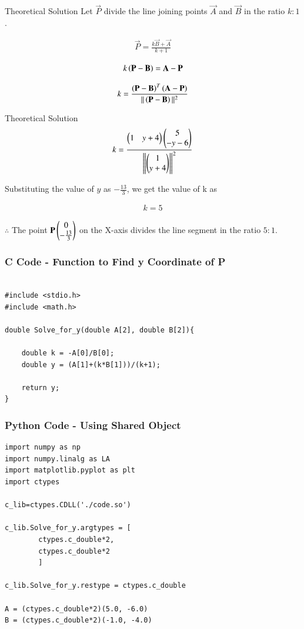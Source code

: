 \documentclass{beamer}
\begin{document}
\begin{frame}{Theoretical Solution}
Let $\vec{P}$ divide the line joining points $\vec{A}$ and $\vec{B}$ in the ratio $k:1$. 

\begin{align}
    \vec{P}=\frac{k\vec{B}+\vec{A}}{k+1}
\end{align}

\begin{align}
    k\left(\mathbf{P}- \mathbf{B}\right) = \mathbf{A}-\mathbf{P}
\end{align}

\begin{align}
    k=\frac{\left(\mathbf{P}-\mathbf{B}\right)^T\left(\mathbf{A}-\mathbf{P}\right)}{||\left(\mathbf{P}-\mathbf{B}\right)||^2}
\end{align}
\end{frame}

\begin{frame}{Theoretical Solution}
    \begin{align}
      k=\frac{\begin{pmatrix}1 & y+4\end{pmatrix}\begin{pmatrix}5\\-y-6\end{pmatrix}}{{\left\lVert\begin{pmatrix}1 \\ y+4\end{pmatrix}\right\rVert}^2}
\end{align}

Substituting the value of $y$ as $-\frac{13}{3}$, we get the value of k as

\begin{align}
    k=5
\end{align}

$\therefore$ The point $\mathbf{P}\begin{pmatrix}0\\-\frac{13}{3}\end{pmatrix}$ on the X-axis divides the line segment in the ratio $5:1$. 
\end{frame}


\begin{frame}[fragile]
    \frametitle{C Code - Function to Find y Coordinate of P}

    \begin{lstlisting}

#include <stdio.h>
#include <math.h>

double Solve_for_y(double A[2], double B[2]){
	
	double k = -A[0]/B[0];
	double y = (A[1]+(k*B[1]))/(k+1);

	return y;
}
    \end{lstlisting}

\end{frame}

\begin{frame}[fragile]
    \frametitle{Python Code - Using Shared Object}
    \begin{lstlisting}
import numpy as np
import numpy.linalg as LA
import matplotlib.pyplot as plt
import ctypes

c_lib=ctypes.CDLL('./code.so')

c_lib.Solve_for_y.argtypes = [
        ctypes.c_double*2,
        ctypes.c_double*2
        ]

c_lib.Solve_for_y.restype = ctypes.c_double

A = (ctypes.c_double*2)(5.0, -6.0) 
B = (ctypes.c_double*2)(-1.0, -4.0)

\end{lstlisting}
\end{frame}
\end{document}
